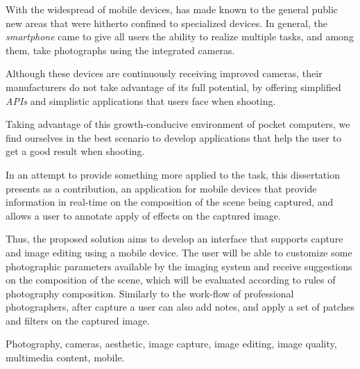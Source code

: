 \abstractEN

With the widespread of mobile devices, has made known to the general public new areas that were hitherto confined to specialized devices. In general, the \emph{smartphone} came to give all users the ability to realize multiple tasks, and among them, take photographs using the integrated cameras.


Although these devices are continuously receiving improved cameras, their manufacturers do not take advantage of its full potential, by offering simplified \emph{APIs} and simplistic applications that users face when shooting.


Taking advantage of this growth-conducive environment of pocket computers, we find ourselves in the best scenario to develop applications that help the user to get a good result when shooting.


In an attempt to provide something more applied to the task, this dissertation presents as a contribution, an application for mobile devices that provide information in real-time on the composition of the scene being captured, and allows a user to annotate apply of effects on the captured image.

Thus, the proposed solution aims to develop an interface that supports capture and image editing using a mobile device. The user will be able to customize some photographic parameters available by the imaging system and receive suggestions on the composition of the scene, which will be evaluated according to rules of photography composition. Similarly to the work-flow of professional photographers, after capture a user can also add notes, and apply a set of patches and filters on the captured image.

\begin{keywords}
Photography, cameras, aesthetic, image capture, image editing, image quality, multimedia content, mobile.
\end{keywords}
